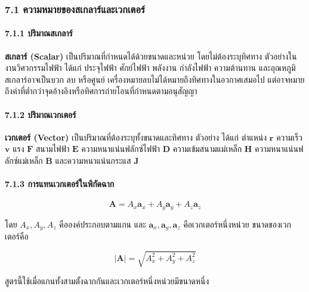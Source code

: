 \subsubsection{7.1 ความหมายของสเกลาร์และเวกเตอร์}

\paragraph{7.1.1 ปริมาณสเกลาร์}

\textbf{สเกลาร์ (Scalar)} เป็นปริมาณที่กำหนดได้ด้วยขนาดและหน่วย โดยไม่ต้องระบุทิศทาง ตัวอย่างในงานวิศวกรรมไฟฟ้า ได้แก่ ประจุไฟฟ้า ศักย์ไฟฟ้า พลังงาน กำลังไฟฟ้า ความต้านทาน และอุณหภูมิ สเกลาร์อาจเป็นบวก ลบ หรือศูนย์ เครื่องหมายลบไม่ได้หมายถึงทิศทางในอวกาศเสมอไป แต่อาจหมายถึงค่าที่ต่ำกว่าจุดอ้างอิงหรือทิศการถ่ายโอนที่กำหนดตามอนุสัญญา

\paragraph{7.1.2 ปริมาณเวกเตอร์}

\textbf{เวกเตอร์ (Vector)} เป็นปริมาณที่ต้องระบุทั้งขนาดและทิศทาง ตัวอย่าง ได้แก่ ตำแหน่ง \(\mathbf{r}\) ความเร็ว \(\mathbf{v}\) แรง \(\mathbf{F}\) สนามไฟฟ้า \(\mathbf{E}\) ความหนาแน่นฟลักซ์ไฟฟ้า \(\mathbf{D}\) ความเข้มสนามแม่เหล็ก \(\mathbf{H}\) ความหนาแน่นฟลักซ์แม่เหล็ก \(\mathbf{B}\) และความหนาแน่นกระแส \(\mathbf{J}\)

\paragraph{7.1.3 การแทนเวกเตอร์ในพิกัดฉาก}

\[
\mathbf{A}=A_x\mathbf{a}_x+A_y\mathbf{a}_y+A_z\mathbf{a}_z
\]

โดย \(A_x,A_y,A_z\) คือองค์ประกอบตามแกน และ \(\mathbf{a}_x,\mathbf{a}_y,\mathbf{a}_z\) คือเวกเตอร์หนึ่งหน่วย ขนาดของเวกเตอร์คือ

\[
|\mathbf{A}|=\sqrt{A_x^2+A_y^2+A_z^2}
\]

สูตรนี้ใช้เมื่อแกนทั้งสามตั้งฉากกันและเวกเตอร์หนึ่งหน่วยมีขนาดหนึ่ง


